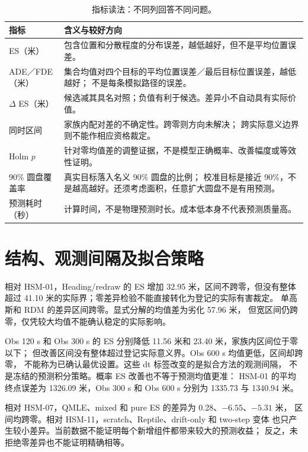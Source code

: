 \begin{table}[htbp]
\centering\small
\caption{指标读法：不同列回答不同问题。}
\label{tab:metric-reader}\hypertarget{tab:metric-reader}{}
\begin{tabular}{@{}p{.22\linewidth}p{.69\linewidth}@{}}
\toprule
指标 & 含义与较好方向\\
\midrule
ES（米） & 包含位置和分散程度的分布误差，越低越好，但不是平均位置误差。\\
ADE／FDE（米） & 集合均值对四个目标的平均位置误差／最后目标位置误差，越低越好；
不是每条模拟路径的误差。\\
$\Delta$ ES（米） & 候选减其具名对照；负值有利于候选。差异小不自动具有实际价值。\\
同时区间 & 家族内配对差的不确定性。跨零则方向未解决；
跨实际意义边界则不能作相应资格裁定。\\
Holm $p$ & 针对零均值差的调整证据，不是模型正确概率、改善幅度或等效性证明。\\
90\% 圆盘覆盖率 & 真实目标落入名义 90\% 圆盘的比例；
校准目标是接近 90\%，不是越高越好。还须考虑面积，任意扩大圆盘不是有用预测。\\
预测耗时（秒） & 计算时间，不是物理预测时长。成本低本身不代表预测质量高。\\
\bottomrule
\end{tabular}
\end{table}

\FloatBarrier

\section{结构、观测间隔及拟合策略}
\label{sec:method-findings}\hypertarget{sec:method-findings}{}
相对 HSM-01，Heading/redraw 的 ES 增加 32.95 米，区间不跨零，但没有整体超过
41.10 米的实际界；零差异检验不能直接转化为登记的实际有害裁定。
单高斯和 RDM 的差异区间跨零。显式分解的均值差为劣化 57.96 米，
但宽区间仍跨零，仅凭较大均值不能确认稳定的实际影响。

Obs 120 s 和 Obs 300 s 的 ES 分别降低 11.56 米和 23.40 米，家族内区间位于零以下；
但改善区间没有整体超过登记实际意义界。Obs 600 s 均值更低，区间却跨零，
不能称为已确认最优设置。这些 dt 标签改变的是拟合方法的观测间隔，
不是冻结的预测积分策略。概率 ES 改善也不等于预测均值更准：
HSM-01 的平均终点误差为 1326.09 米，Obs 300 s 和 Obs 600 s 分别为 1335.73 与 1340.94 米。

相对 HSM-07，QMLE、mixed 和 pure ES 的差异为 0.28、$-6.55$、$-5.31$ 米，
区间均跨零。相对 HSM-11，scratch、Reptile、drift-only 和 two-step 变体
也只产生较小差异。当前数据不能证明每个新增组件都带来较大的预测收益；
反之，未拒绝零差异也不能证明精确相等。

